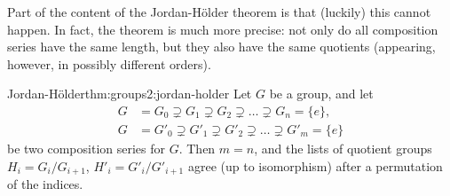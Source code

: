 Part of the content of the Jordan-H\"older theorem is that (luckily)
this cannot happen. In fact, the theorem is much more precise: not
only do all composition series have the same length, but they also
have the same quotients (appearing, however, in possibly different
orders).
\begin{thm}{Jordan-H\"older}{thm:groups2:jordan-holder}
  Let $G$ be a group, and let
  \begin{align*}
    G &= G_0 \supsetneq G_1 \supsetneq G_2 \supsetneq \dots
        \supsetneq G_n = \{e\},\\
    G &= G'_0 \supsetneq G'_1 \supsetneq G'_2 \supsetneq \dots
        \supsetneq G'_m = \{e\}
  \end{align*}
  be two composition series for $G$. Then $m = n$, and the lists of
  quotient groups $H_i = G_i/G_{i+1}$, $H'_i = G'_i/G'_{i+1}$ agree
  (up to isomorphism) after a permutation of the indices.
\end{thm}
